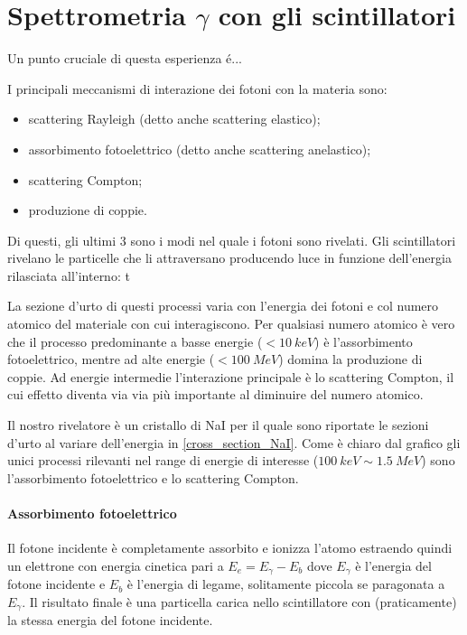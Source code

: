 \section{Spettrometria $\gamma$ con gli scintillatori}
Un punto cruciale di questa esperienza é...

I principali meccanismi di interazione dei fotoni con la materia sono:
\begin{itemize}
	\item scattering Rayleigh (detto anche scattering elastico);
	\item assorbimento fotoelettrico (detto anche scattering anelastico);
	\item scattering Compton;
	\item produzione di coppie.
\end{itemize}
 Di questi, gli ultimi 3 sono i modi nel quale i fotoni sono rivelati.
 Gli scintillatori rivelano le particelle che li attraversano producendo luce in funzione dell'energia rilasciata all'interno: t
 
 La sezione d'urto di questi processi varia con l'energia dei fotoni e col numero atomico del materiale con cui interagiscono.
 Per qualsiasi numero atomico è vero che il processo predominante a basse energie ($< \SI{10}{keV}$) è l'assorbimento fotoelettrico, mentre ad alte energie ($< \SI{100}{MeV}$) domina la produzione di coppie. Ad energie intermedie l'interazione principale è lo scattering Compton, il cui effetto diventa via via più importante al diminuire del numero atomico. 
 
 Il nostro rivelatore è un cristallo di NaI per il quale sono riportate le sezioni d'urto al variare dell'energia in \autoref{cross_section_NaI}.
 Come è chiaro dal grafico gli unici processi rilevanti nel range di energie di interesse ($\SI{100}{keV} \sim \SI{1.5}{MeV}$) sono l'assorbimento fotoelettrico e lo scattering Compton.
 
 \paragraph{Assorbimento fotoelettrico}
 Il fotone incidente è completamente assorbito e ionizza l'atomo estraendo quindi un elettrone con energia cinetica pari a $E_e = E_{\gamma} - E_b$ dove $E_{\gamma}$ è l'energia del fotone incidente e $E_b$ è l'energia di legame, solitamente piccola se paragonata a $E_{\gamma}$. Il risultato finale è una particella carica nello scintillatore con (praticamente) la stessa energia del fotone incidente.


